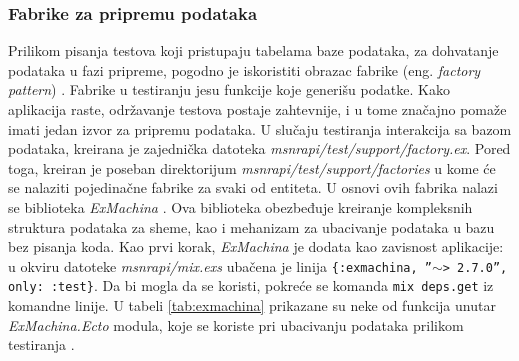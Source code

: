 \documentclass[12pt,oneside]{memoir}
\begin{document}
\subsubsection{Fabrike za pripremu podataka}
\par Prilikom pisanja testova koji pristupaju tabelama baze podataka, za dohvatanje podataka u fazi pripreme, pogodno je iskoristiti obrazac fabrike (eng. \emph{factory pattern}) \cite{fabrike}. Fabrike u testiranju jesu funkcije koje generišu podatke. Kako aplikacija raste, održavanje testova postaje zahtevnije, i u tome značajno pomaže imati jedan izvor za pripremu podataka. U slučaju testiranja interakcija sa bazom podataka, kreirana je zajednička datoteka \emph{msnr{\textunderscore}api/test/support/factory.ex}. Pored toga, kreiran je poseban direktorijum \emph{msnr{\textunderscore}api/test/support/factories} u kome će se nalaziti pojedinačne fabrike za svaki od entiteta. U osnovi ovih fabrika nalazi se biblioteka \emph{ExMachina} \cite{exmachina}. Ova biblioteka obezbeđuje kreiranje kompleksnih struktura podataka za sheme, kao i mehanizam za ubacivanje podataka u bazu bez pisanja koda. Kao prvi korak, \emph{ExMachina} je dodata kao zavisnost aplikacije: u okviru datoteke \emph{msnr{\textunderscore}api/mix.exs} ubačena je linija \texttt{\{:exmachina, ''$\sim$> 2.7.0'', only: :test\}}. Da bi mogla da se koristi, pokreće se komanda \texttt{mix deps.get} iz komandne linije. U tabeli \ref{tab:exmachina} prikazane su neke od funkcija unutar \emph{ExMachina.Ecto} modula, koje se koriste pri ubacivanju podataka prilikom testiranja \cite{execto}.
\end{document}
